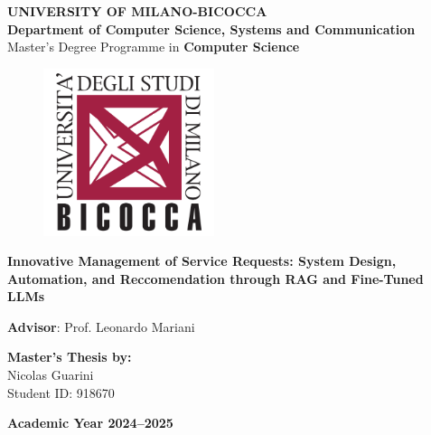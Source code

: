 \begin{titlepage}

\begin{center}
    \normalsize{\textbf{UNIVERSITY OF MILANO-BICOCCA}} \\
    \vspace{3mm}
    \normalsize{\textbf{Department of Computer Science, Systems and Communication}} \\
    \vspace{3mm}
    \normalsize{Master's Degree Programme in \textbf{Computer Science}} \\
    \vspace{15mm}
\end{center}

\begin{figure}[!htb]
    \centering
    \includegraphics[width=5cm]{images/logo bicocca.png}
\end{figure}

\vspace{20mm}
\begin{center}
    \Large{\textbf{Innovative Management of Service Requests: System Design, Automation, and Reccomendation through RAG and Fine-Tuned LLMs}}
\end{center}

\vspace*{\fill}

\begin{flushleft}
    \textbf{Advisor}: Prof. Leonardo Mariani
\end{flushleft}

\vspace{10mm}

\begin{flushright}
    \textbf{Master’s Thesis by:} \\
    Nicolas Guarini \\
    Student ID: 918670
\end{flushright}

\vspace{15mm}

\begin{center}
    \normalsize{\textbf{Academic Year 2024–2025}}
\end{center}

\end{titlepage}

